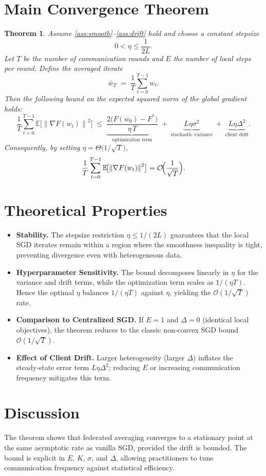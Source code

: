\documentclass{article}
\newtheorem{theorem}{Theorem}
\newcommand{\E}{\mathbb{E}}
\newcommand{\norm}[1]{\left\|#1\right\|}
\begin{document}
\section*{Main Convergence Theorem}
\begin{theorem}\label{thm:main}
Assume \ref{ass:smooth}–\ref{ass:drift} hold and choose a constant stepsize
\[
0<\eta\le\frac{1}{2L}.
\]
Let $T$ be the number of communication rounds and $E$ the number of local steps per round.
Define the averaged iterate
\[
\bar w_T\;=\;\frac1T\sum_{t=0}^{T-1} w_t .
\]
Then the following bound on the expected squared norm of the global gradient holds:
\[
\frac1T\sum_{t=0}^{T-1}\E\!\bigl[\norm{\nabla F(w_t)}^2\bigr]
\;\le\;
\underbrace{\frac{2\bigl(F(w_0)-F^*\bigr)}{\eta\,T}}_{\text{optimization term}}
\;+\;
\underbrace{L\eta\sigma^2}_{\text{stochastic variance}}
\;+\;
\underbrace{L\eta\Delta^2}_{\text{client drift}} .
\]
Consequently, by setting $\eta = \Theta\!\bigl(1/\sqrt{T}\bigr)$,
\[
\frac1T\sum_{t=0}^{T-1}\E\!\bigl[\norm{\nabla F(w_t)}^2\bigr]=
\mathcal{O}\!\Bigl(\frac{1}{\sqrt{T}}\Bigr).
\]
\end{theorem}

\section*{Theoretical Properties}
\begin{itemize}[leftmargin=*]
\item \textbf{Stability.} The stepsize restriction $\eta\le 1/(2L)$ guarantees that the local SGD iterates remain within a region where the smoothness inequality is tight, preventing divergence even with heterogeneous data.
\item \textbf{Hyperparameter Sensitivity.} The bound decomposes linearly in $\eta$ for the variance and drift terms, while the optimization term scales as $1/(\eta T)$. Hence the optimal $\eta$ balances $1/(\eta T)$ against $\eta$, yielding the $\mathcal{O}(1/\sqrt{T})$ rate.
\item \textbf{Comparison to Centralized SGD.} If $E=1$ and $\Delta=0$ (identical local objectives), the theorem reduces to the classic non‑convex SGD bound $\mathcal{O}(1/\sqrt{T})$.
\item \textbf{Effect of Client Drift.} Larger heterogeneity (larger $\Delta$) inflates the steady‑state error term $L\eta\Delta^2$; reducing $E$ or increasing communication frequency mitigates this term.
\end{itemize}

\section*{Discussion}
The theorem shows that federated averaging converges to a stationary point at the same asymptotic rate as vanilla SGD, provided the drift is bounded. The bound is explicit in $E$, $K$, $\sigma$, and $\Delta$, allowing practitioners to tune communication frequency against statistical efficiency.
\end{document}
